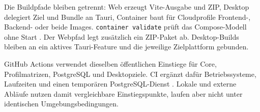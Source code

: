 Die Buildpfade bleiben getrennt: Web erzeugt Vite-Ausgabe und ZIP, Desktop
delegiert Ziel und Bundle an Tauri, Container baut für Cloudprofile Frontend-,
Backend- oder beide Images. \texttt{container validate} prüft das
Compose-Modell ohne Start \parencite{kleiveist2026container,kleiveist2026release}.
Der Webpfad legt zusätzlich ein ZIP-Paket ab. Desktop-Builds bleiben an ein
aktives Tauri-Feature und die jeweilige Zielplattform gebunden.

GitHub Actions verwendet dieselben öffentlichen Einstiege für Core,
Profilmatrizen, PostgreSQL und Desktopziele. CI ergänzt dafür Betriebssysteme,
Laufzeiten und einen temporären PostgreSQL-Dienst
\parencite{kleiveist2026ci}.
Lokale und externe Abläufe nutzen damit vergleichbare Einstiegspunkte, laufen
aber nicht unter identischen Umgebungsbedingungen.
